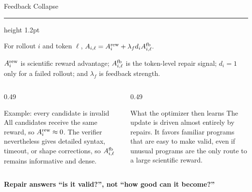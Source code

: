 \documentclass[aspectratio=169]{beamer}
\newcommand{\titlerule}{{\color{titledred}\hrule height 1.2pt}}
\begin{document}
\begin{frame}{Feedback Collapse}
\vspace{-0.35em}
\titlerule
\vspace{0.45em}

\begin{block}{}
For rollout $i$ and token $\ell$,
$A_{i,\ell}=A_i^{\rm rew}+\lambda_f d_iA_{i,\ell}^{\rm fb}.$
\vspace{0.5em}

$A_i^{\rm rew}$ is scientific reward advantage;
$A_{i,\ell}^{\rm fb}$ is the token-level repair signal;
$d_i=1$ only for a failed rollout; and $\lambda_f$ is feedback strength.
\end{block}

\begin{columns}[T,onlytextwidth]
\begin{column}{0.49\textwidth}
\begin{block}{Example: every candidate is invalid}
All candidates receive the same reward, so $A_i^{\rm rew}\approx0$. The
verifier nevertheless gives detailed syntax, timeout, or shape corrections,
so $A_{i,\ell}^{\rm fb}$ remains informative and dense.
\end{block}
\end{column}
\begin{column}{0.49\textwidth}
\begin{block}{What the optimizer then learns}
The update is driven almost entirely by repairs. It favors familiar programs
that are easy to make valid, even if unusual programs are the only route to a
large scientific reward.
\end{block}
\end{column}
\end{columns}

\begin{center}
\color{titledred}\bfseries Repair answers ``is it valid?'', not ``how good can it become?''
\end{center}
\end{frame}



\end{document}
